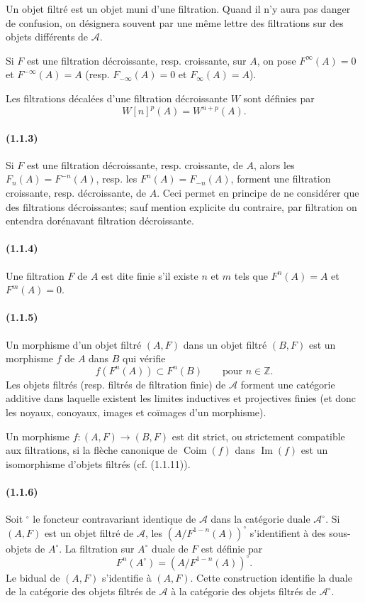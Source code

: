 \documentclass[10pt]{article}
\newcommand{\Z}{\mathbb Z}
\newcommand{\Coim}{\operatorname{Coim}}
\newcommand{\Imop}{\operatorname{Im}}
\newcommand{\fg}{\guillemotright}
\newcommand{\og}{\guillemotleft}
\newcommand{\calA}{\mathcal A}
\begin{document}
Un objet filtré est un objet muni d'une filtration. Quand il n'y aura pas danger de confusion, on désignera souvent par une même lettre des filtrations sur des objets différents de $\calA$.

Si $F$ est une filtration décroissante, resp. croissante, sur $A$, on pose $F^\infty(A)=0$ et $F^{-\infty}(A)=A$ (resp. $F_{-\infty}(A)=0$ et $F_{\infty}(A)=A$).

Les filtrations décalées d'une filtration décroissante $W$ sont définies par
\[
W[n]^p(A)=W^{n+p}(A).
\]

\paragraph{(1.1.3)} Si $F$ est une filtration décroissante, resp. croissante, de $A$, alors les $F_n(A)=F^{-n}(A)$, resp. les $F^n(A)=F_{-n}(A)$, forment une filtration croissante, resp. décroissante, de $A$. Ceci permet en principe de ne considérer que des filtrations décroissantes; sauf mention explicite du contraire, par \og filtration\fg{} on entendra dorénavant \og filtration décroissante\fg{}.

\paragraph{(1.1.4)} Une filtration $F$ de $A$ est dite finie s'il existe $n$ et $m$ tels que $F^n(A)=A$ et $F^m(A)=0$.

\paragraph{(1.1.5)} Un morphisme d'un objet filtré $(A,F)$ dans un objet filtré $(B,F)$ est un morphisme $f$ de $A$ dans $B$ qui vérifie
\[
f(F^n(A))\subset F^n(B)\qquad\text{pour }n\in\Z.
\]
Les objets filtrés (resp. filtrés de filtration finie) de $\calA$ forment une catégorie additive dans laquelle existent les limites inductives et projectives finies (et donc les noyaux, conoyaux, images et coïmages d'un morphisme).

Un morphisme $f:(A,F)\to(B,F)$ est dit strict, ou strictement compatible aux filtrations, si la flèche canonique de $\Coim(f)$ dans $\Imop(f)$ est un isomorphisme d'objets filtrés (cf. (1.1.11)).

\paragraph{(1.1.6)} Soit ${}^{\circ}$ le foncteur contravariant identique de $\calA$ dans la catégorie duale $\calA^{\circ}$. Si $(A,F)$ est un objet filtré de $\calA$, les $(A/F^{1-n}(A))^{\circ}$ s'identifient à des sous-objets de $A^{\circ}$. La filtration sur $A^{\circ}$ duale de $F$ est définie par
\[
F^n(A^{\circ})=(A/F^{1-n}(A))^{\circ}.
\]
Le bidual de $(A,F)$ s'identifie à $(A,F)$. Cette construction identifie la duale de la catégorie des objets filtrés de $\calA$ à la catégorie des objets filtrés de $\calA^{\circ}$.
\end{document}
